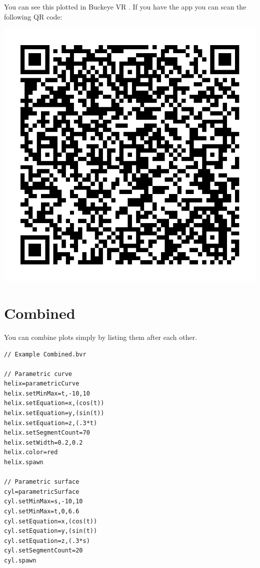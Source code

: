 \documentclass{ximera}
\begin{document}
You can see this plotted in Buckeye VR
.
If you have the app you can scan the following QR code:
\begin{image}
\includegraphics{bvrQR2.png}  
\end{image}

\section{Combined}

You can combine plots simply by listing them after each other.

\begin{verbatim}
// Example Combined.bvr

// Parametric curve
helix=parametricCurve
helix.setMinMax=t,-10,10
helix.setEquation=x,(cos(t))
helix.setEquation=y,(sin(t))
helix.setEquation=z,(.3*t)
helix.setSegmentCount=70
helix.setWidth=0.2,0.2
helix.color=red
helix.spawn

// Parametric surface
cyl=parametricSurface
cyl.setMinMax=s,-10,10
cyl.setMinMax=t,0,6.6
cyl.setEquation=x,(cos(t))
cyl.setEquation=y,(sin(t))
cyl.setEquation=z,(.3*s)
cyl.setSegmentCount=20
cyl.spawn
\end{verbatim}
\end{document}
